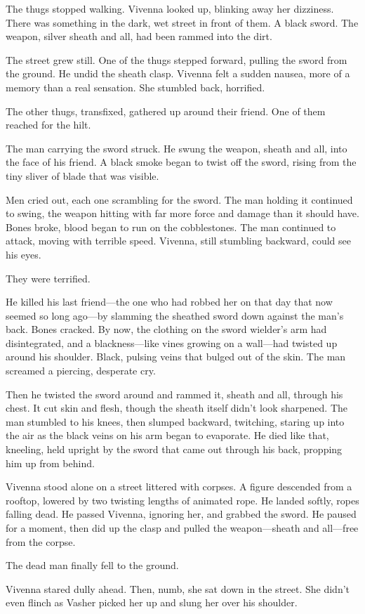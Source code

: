 The thugs stopped walking. Vivenna looked up, blinking away her dizziness. There was something in the dark, wet street in front of them. A black sword. The weapon, silver sheath and all, had been rammed into the dirt.

The street grew still. One of the thugs stepped forward, pulling the sword from the ground. He undid the sheath clasp. Vivenna felt a sudden nausea, more of a memory than a real sensation. She stumbled back, horrified.

The other thugs, transfixed, gathered up around their friend. One of them reached for the hilt.

The man carrying the sword struck. He swung the weapon, sheath and all, into the face of his friend. A black smoke began to twist off the sword, rising from the tiny sliver of blade that was visible.

Men cried out, each one scrambling for the sword. The man holding it continued to swing, the weapon hitting with far more force and damage than it should have. Bones broke, blood began to run on the cobblestones. The man continued to attack, moving with terrible speed. Vivenna, still stumbling backward, could see his eyes.

They were terrified.

He killed his last friend—the one who had robbed her on that day that now seemed so long ago—by slamming the sheathed sword down against the man’s back. Bones cracked. By now, the clothing on the sword wielder’s arm had disintegrated, and a blackness—like vines growing on a wall—had twisted up around his shoulder. Black, pulsing veins that bulged out of the skin. The man screamed a piercing, desperate cry.

Then he twisted the sword around and rammed it, sheath and all, through his chest. It cut skin and flesh, though the sheath itself didn’t look sharpened. The man stumbled to his knees, then slumped backward, twitching, staring up into the air as the black veins on his arm began to evaporate. He died like that, kneeling, held upright by the sword that came out through his back, propping him up from behind.

Vivenna stood alone on a street littered with corpses. A figure descended from a rooftop, lowered by two twisting lengths of animated rope. He landed softly, ropes falling dead. He passed Vivenna, ignoring her, and grabbed the sword. He paused for a moment, then did up the clasp and pulled the weapon—sheath and all—free from the corpse.

The dead man finally fell to the ground.

Vivenna stared dully ahead. Then, numb, she sat down in the street. She didn’t even flinch as Vasher picked her up and slung her over his shoulder.

